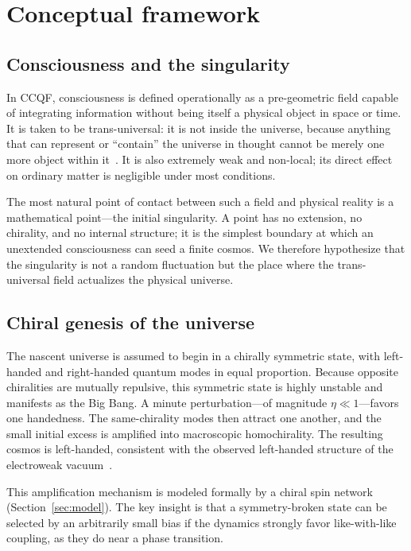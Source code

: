 \documentclass[twocolumn,11pt,a4paper]{article}
\begin{document}
\section{Conceptual framework}
\label{sec:framework}

\subsection{Consciousness and the singularity}

In CCQF, consciousness is defined operationally as a pre-geometric field capable of integrating information without being itself a physical object in space or time. It is taken to be trans-universal: it is not inside the universe, because anything that can represent or ``contain'' the universe in thought cannot be merely one more object within it~\cite{wheeler1983, tononi2016}. It is also extremely weak and non-local; its direct effect on ordinary matter is negligible under most conditions.

The most natural point of contact between such a field and physical reality is a mathematical point---the initial singularity. A point has no extension, no chirality, and no internal structure; it is the simplest boundary at which an unextended consciousness can seed a finite cosmos. We therefore hypothesize that the singularity is not a random fluctuation but the place where the trans-universal field actualizes the physical universe.

\subsection{Chiral genesis of the universe}

The nascent universe is assumed to begin in a chirally symmetric state, with left-handed and right-handed quantum modes in equal proportion. Because opposite chiralities are mutually repulsive, this symmetric state is highly unstable and manifests as the Big Bang. A minute perturbation---of magnitude $\eta \ll 1$---favors one handedness. The same-chirality modes then attract one another, and the small initial excess is amplified into macroscopic homochirality. The resulting cosmos is left-handed, consistent with the observed left-handed structure of the electroweak vacuum~\cite{lee1956, wu1957}.

This amplification mechanism is modeled formally by a chiral spin network (Section~\ref{sec:model}). The key insight is that a symmetry-broken state can be selected by an arbitrarily small bias if the dynamics strongly favor like-with-like coupling, as they do near a phase transition.
\end{document}
